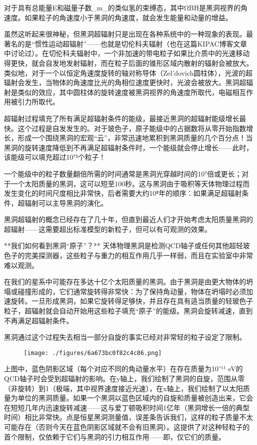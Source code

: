 对于具有总能量E和磁量子数_m_的类似氢的束缚态，其中ΩBH是黑洞视界的角速度。如果粒子的角速度小于黑洞的角速度，就会发生能量和动量的增益。

虽然这听起来很神秘，但黑洞超辐射只是出现在各种系统中的一种现象的表现。最著名的是“惯性运动超辐射”——也就是切伦科夫辐射（也在这篇KIPAC博客文章中讨论过）。在切伦科夫辐射中，一个非加速的带电粒子如果比介质中的光速移动得更快，就会自发地发射辐射，而在粒子后面的锥形区域内散射的辐射会被放大。类似地，对于一个以恒定角速度旋转的轴对称导体（Zel’dovich圆柱体），光波的超辐射会发生，当物体的角速度比光的角相位速度更快时，光波会被放大。黑洞超辐射是类似的效应，其中圆柱体的旋转速度被黑洞视界的角速度所取代，电磁相互作用被引力所取代。

超辐射过程填充了所有满足超辐射条件的能级，最接近黑洞的超辐射能级增长最快。这个过程是自发发生的。对于玻色子，原子能级中的占据数将从零开始指数增长，形成一个围绕黑洞的宏观“云”，非常迅速地累积到黑洞质量的几个百分点！当黑洞的旋转速度降低到不再满足超辐射条件时，一个能级就会停止增长——此时，该能级可以填充超过10⁷⁵个粒子！

一个能级中的粒子数量翻倍所需的时间通常是黑洞光穿越时间的10⁷倍或更长；对于一个太阳质量的黑洞，这可以短至100秒。这与黑洞由于吸积等天体物理过程而发生变化的时间尺度相比非常快，后者需要大约10⁸年的顺序：如果满足超辐射条件，超辐射可以主导黑洞的演化。

黑洞超辐射的概念已经存在了几十年，但直到最近人们才开始考虑太阳质量黑洞的超辐射——这需要超出标准模型的新粒子，但可以有可观测的效果。

**我们如何看到黑洞“原子”？**
天体物理黑洞是检测QCD轴子或任何其他超轻玻色子的完美探测器，这些粒子与重力的相互作用几乎一样弱，而且在实验室中非常难以观测。

在我们的星系中可能存在多达十亿个太阳质量的黑洞。由于黑洞是由更大物体的坍塌或碰撞形成的，它们通常旋转得非常快：为了保持角动量，物体在坍塌时必须加速旋转。一旦形成黑洞，如果它旋转得足够快，并且存在具有适当质量的轻玻色子粒子，超辐射就会自动开始用这些粒子填充“原子”的能级。黑洞会旋转减速，直到不再满足超辐射条件。

黑洞通过这个过程失去相当一部分自旋的事实已经对非常轻的粒子设定了限制。

\begin{figure}[ht]
\centering
\texttt{[image: ./figures/6a673bc0f82c4c86.png]}
\caption{} \label{fig_GAtom_3}
\end{figure}

上图中，蓝色阴影区域（每个对应不同的角动量水平）在存在质量为10⁻¹¹ eV的QCD轴子时会受到超辐射的影响。在y轴上，我们绘制了黑洞的自旋，范围从零（非旋转）到1（极端，其中视界速度接近光速），在x轴上，我们绘制了以太阳质量为单位的黑洞质量。如果一个黑洞以蓝色区域内的自旋和质量被创造出来，它会在短短几年内迅速旋转减速——这与爱丁顿吸积时间1亿年（黑洞增长一倍的典型时间）相比非常快。点是恒星黑洞测量值，误差条告诉我们，这样的粒子质量不太可能存在（否则今天在蓝色阴影区域就不会有旧黑洞）。这提供了对这种轻粒子的首个限制，仅依赖于它们与黑洞的引力相互作用——即，仅它们的质量。

